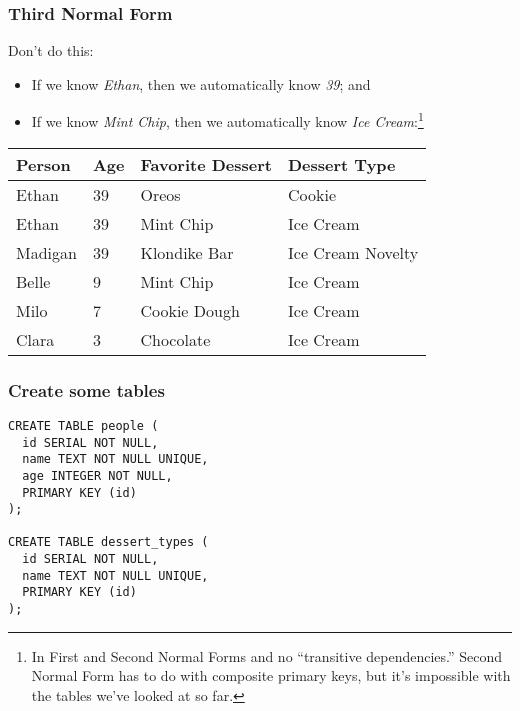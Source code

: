\documentclass{beamer}
\begin{document}
\begin{frame}
  \frametitle{Third Normal Form}
  Don't do this:

  \begin{itemize}
    \item If we know \textit{Ethan}, then we automatically know
          \textit{39}; and
    \item If we know \textit{Mint Chip}, then we automatically
          know \textit{Ice Cream}:\footnote{In First and Second Normal Forms
            and no ``transitive dependencies.'' Second Normal Form has to do
            with composite primary keys, but it's impossible with the tables
            we've looked at so far.}
  \end{itemize}

  \begin{table}[]
    \footnotesize
    \begin{tabular}{@{}llll@{}}
      \toprule
      Person  & Age & Favorite Dessert & Dessert Type      \\ \midrule
      Ethan   & 39  & Oreos            & Cookie            \\
      Ethan   & 39  & Mint Chip        & Ice Cream         \\
      Madigan & 39  & Klondike Bar     & Ice Cream Novelty \\
      Belle   & 9   & Mint Chip        & Ice Cream         \\
      Milo    & 7   & Cookie Dough     & Ice Cream         \\
      Clara   & 3   & Chocolate        & Ice Cream         \\ \bottomrule
    \end{tabular}
  \end{table}

\end{frame}

\begin{frame}[fragile]
  \frametitle{Create some tables}

  \begin{lstlisting}
CREATE TABLE people (
  id SERIAL NOT NULL,
  name TEXT NOT NULL UNIQUE,
  age INTEGER NOT NULL,
  PRIMARY KEY (id)
);

CREATE TABLE dessert_types (
  id SERIAL NOT NULL,
  name TEXT NOT NULL UNIQUE,
  PRIMARY KEY (id)
);
  \end{lstlisting}
\end{frame}
\end{document}

